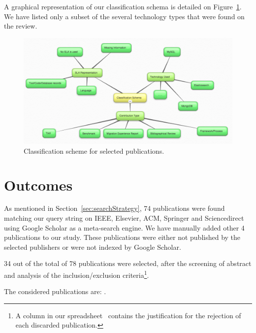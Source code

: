 \documentclass[]{tEIS2e}
\theoremstyle{plain}
\theoremstyle{remark}
\begin{document}
A graphical representation of our classification schema is detailed on Figure~\ref{fig:classificationSchema}. We have listed only a subset of the several technology types that were found on the review.

\begin{figure}[!h]
\centering
\includegraphics[width=130mm]{classificationSchema.png}
\caption{Classification scheme for selected publications. \label{fig:classificationSchema}}
\end{figure}

\section{Outcomes}
\label{sec:outcomes}

As mentioned in Section~\ref{sec:searchStrategy}, 74 publications were found matching our query string on IEEE, Elsevier, ACM, Springer and Sciencedirect using Google Scholar as a meta-search engine. We have manually added other 4 publications to our study. These publications were either not published by the selected publishers or were not indexed by Google Scholar. 

34 out of the total of 78 publications were selected, after the screening of abstract and analysis of the inclusion/exclusion criteria\footnote{A column in our spreadsheet~\citep{systematicMappingSpreadsheet} contains the justification for the rejection of each discarded publication.}.

The considered publications are: \citep{6665220} \citep{6253526}  \citep{6461875} \citep{6597164} \citep{6616442} \citep{Xiong:2012:DMR:2213598.2213614} \citep{Alomari:2014:CFD:2684200.2684324} \citep{6632740} \citep{6253597} \citep{cloudhosteddatabases} \citep{6655733} \citep{192837618237651293} \citep{6616442} \citep{designinganddevelopment} \citep{5959767} \citep{Petcu20131417} \citep{Giannikis:2013:WOU:2463676.2463678} \citep{1236781237} \citep{6280329} \citep{6681233} \citep{Xiong:2011:APA:2038916.2038931} \citep{7037676} \citep{7017947} \citep{Qiao:2013:BFE:2463676.2465298} \citep{5742778} \citep{Montes20132026} \citep{Elmore:2013:CTB:2463676.2465308} \citep{12789361729836} \citep{6842585} \citep{Shue:2014:ARV:2592798.2592823} \citep{Schram:2012:MND:2384716.2384773} \citep{buazuartransition} \citep{gomez2014building} \citep{6546068}.
\end{document}
